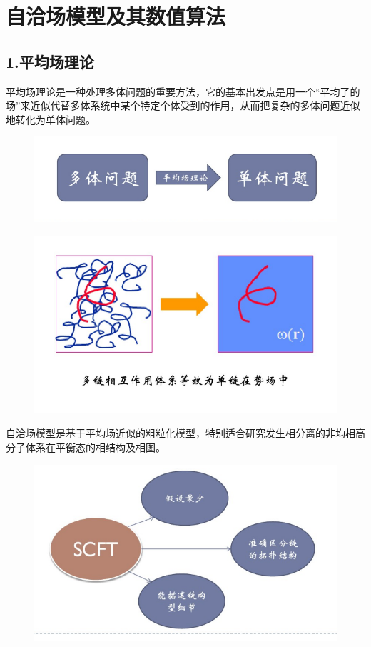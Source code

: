 \documentclass{article}
\begin{document}
\section{自洽场模型及其数值算法}
\subsection{1.平均场理论}
平均场理论是一种处理多体问题的重要方法，它的基本出发点是用一个“平均了的场”来近似代替多体系统中某个特定个体受到的作用，从而把复杂的多体问题近似地转化为单体问题。
\begin{figure}[H]
\centering
\includegraphics[scale=0.5]{./figures/Figure_21.png}
\end{figure}
\begin{figure}[H]
\centering
\includegraphics[scale=0.5]{./figures/Figure_22.png}
\end{figure}
自洽场模型是基于平均场近似的粗粒化模型，特别适合研究发生相分离的非均相高分子体系在平衡态的相结构及相图。
\begin{figure}[H]
\centering
\includegraphics[scale=0.5]{./figures/Figure_23.png}
\end{figure}
\end{document}
